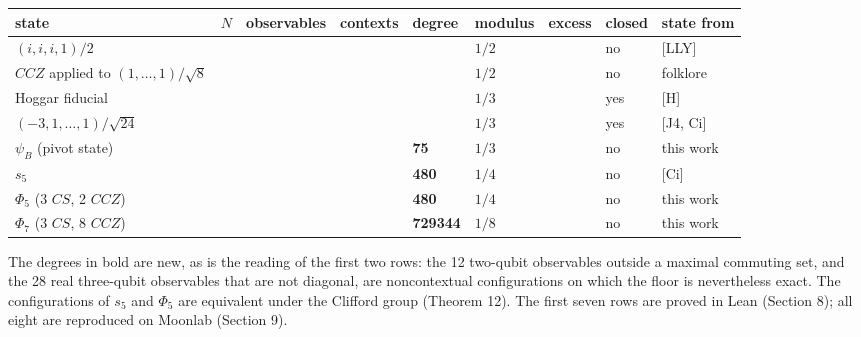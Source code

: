 \documentclass[11pt,a4paper]{article}
\begin{document}
{\def\LTcaptype{none} %
{\footnotesize
\begin{longtable}[]{@{}>{\raggedright\arraybackslash}p{}>{\raggedright\arraybackslash}p{}>{\raggedright\arraybackslash}p{}>{\raggedright\arraybackslash}p{}>{\raggedright\arraybackslash}p{}>{\raggedright\arraybackslash}p{}>{\raggedright\arraybackslash}p{}>{\raggedright\arraybackslash}p{}>{\raggedright\arraybackslash}p{}@{}}
\toprule\noalign{}
state & \(N\) & observables & contexts & degree & modulus & excess & closed & state from \\
\midrule\noalign{}
\endhead
\bottomrule\noalign{}
\endlastfoot
\((i,i,i,1)/2\) & 2 & 12 & 8 & 0 & \(1/2\) & 2 & no & {[}LLY{]} \\
\(CCZ\) applied to \((1,\dots,1)/\sqrt8\) & 3 & 28 & 56 & 0 & \(1/2\) & 6 & no & folklore \\
Hoggar fiducial & 3 & 63 & 315 & 63 & \(1/3\) & 9 & yes & {[}H{]} \\
\((-3,1,\dots,1)/\sqrt{24}\) & 4 & 135 & 1575 & 315 & \(1/3\) & 21 & yes & {[}J4, Ci{]} \\
\(\psi_B\) (pivot state) & 4 & 135 & 1095 & \textbf{75} & \(1/3\) & 21 & no & this work \\
\(s_5\) & 5 & 496 & 10880 & \textbf{480} & \(1/4\) & 60 & no & {[}Ci{]} \\
\(\Phi_5\) (3 \(CS\), 2 \(CCZ\)) & 5 & 496 & 10880 & \textbf{480} & \(1/4\) & 60 & no & this work \\
\(\Phi_7\) (3 \(CS\), 8 \(CCZ\)) & 7 & 8128 & 2824192 & \textbf{729344} & \(1/8\) & 504 & no & this work \\
\end{longtable}
}
}

The degrees in bold are new, as is the reading of the first two rows: the 12 two-qubit observables
outside a maximal commuting set, and the 28 real three-qubit observables that are not diagonal, are
noncontextual configurations on which the floor is nevertheless exact. The configurations of \(s_5\) and
\(\Phi_5\) are equivalent under the Clifford group (Theorem 12). The first seven rows are proved in Lean
(Section 8); all eight are reproduced on Moonlab (Section 9).
\end{document}
